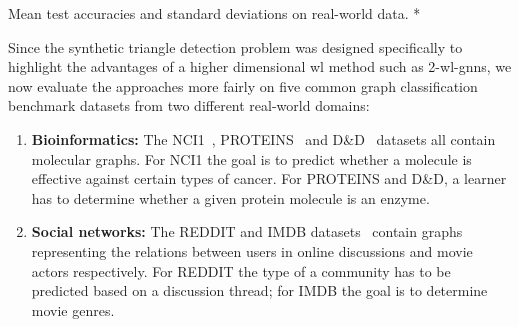 \begin{table}[ht]
	\caption[Mean test accuracies and standard deviations on real-world data.]{
		Mean test accuracies and standard deviations on real-world data.
		\hfill\textcolor{t_darkgreen}{*}\,
	}\label{tbl:eval:real}
	\centering
\end{table}
Since the synthetic triangle detection problem was designed specifically to highlight the advantages of a higher dimensional \ac{wl} method such as 2-\ac{wl}-\acsp{gnn}, we now evaluate the approaches more fairly on five common graph classification benchmark datasets from two different real-world domains:
\begin{enumerate}[label={\textbf{\arabic*.}}]
	\item \textbf{Bioinformatics:}
		The NCI1~\cite{Shervashidze2011}, PROTEINS~\cite{Borgwardt2005a} and D\&D~\cite{Dobson2003} datasets all contain molecular graphs.
		For NCI1 the goal is to predict whether a molecule is effective against certain types of cancer.
		For PROTEINS and D\&D, a learner has to determine whether a given protein molecule is an enzyme.
	\item \textbf{Social networks:}
		The REDDIT and IMDB datasets~\cite{Yanardag2015} contain graphs representing the relations between users in online discussions and movie actors respectively.
		For REDDIT the type of a community has to be predicted based on a discussion thread; for IMDB the goal is to determine movie genres.
\end{enumerate}
